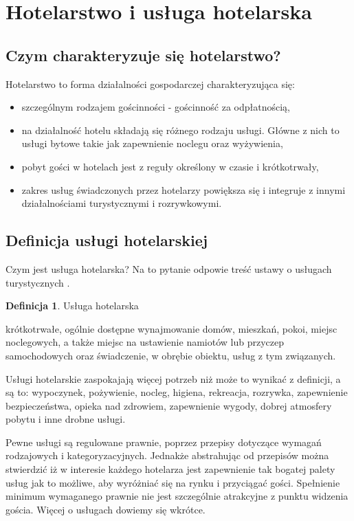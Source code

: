 \documentclass[a4paper,onecolumn,oneside,11pt,wide,floatssmall]{mwrep}
\theoremstyle{definition}
\newtheorem{defn}{Definicja}[section]
\theoremstyle{plain}%
\theoremstyle{remark}
\begin{document}
\section{Hotelarstwo i usługa hotelarska}

\subsection{Czym charakteryzuje się hotelarstwo?}

Hotelarstwo to forma działalności gospodarczej charakteryzująca się:
\begin{itemize} 
  \item szczególnym rodzajem gościnności - gościnność za odpłatnością,
  \item na działalność hotelu składają się różnego rodzaju usługi. Główne z 
  nich to usługi bytowe takie jak zapewnienie noclegu oraz wyżywienia,
  \item pobyt gości w hotelach jest z reguły określony w czasie i 
  krótkotrwały,
  \item zakres usług świadczonych przez hotelarzy powiększa się i integruje 
  z innymi działalnościami turystycznymi i rozrywkowymi.
\end{itemize}

\subsection{Definicja usługi hotelarskiej}

Czym jest usługa hotelarska? Na to pytanie odpowie treść ustawy o usługach 
turystycznych \cite{ust:tur}.

\begin{defn}{Usługa hotelarska}

krótkotrwałe, ogólnie dostępne wynajmowanie domów, mieszkań, pokoi, miejsc 
noclegowych, a także miejsc na ustawienie namiotów lub przyczep 
samochodowych oraz świadczenie, w obrębie obiektu, usług z tym związanych.

\end{defn}

Usługi hotelarskie zaspokajają więcej potrzeb niż może to wynikać z 
definicji, a są to: wypoczynek, pożywienie, nocleg, higiena, rekreacja, 
rozrywka, zapewnienie bezpieczeństwa, opieka nad zdrowiem, zapewnienie 
wygody, dobrej atmosfery pobytu i inne drobne usługi.

Pewne usługi są regulowane prawnie, poprzez przepisy dotyczące wymagań 
rodzajowych i kategoryzacyjnych. Jednakże abstrahując od przepisów można 
stwierdzić iż w interesie każdego hotelarza jest zapewnienie tak bogatej 
palety usług jak to możliwe, aby wyróżniać się na rynku i przyciągać gości. 
Spełnienie minimum wymaganego prawnie nie jest szczególnie atrakcyjne z 
punktu widzenia gościa. Więcej o usługach dowiemy się wkrótce.
\end{document}
